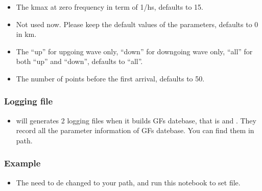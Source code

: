 \documentclass[a4paper,10pt,english,openany]{sphinxmanual}
\begin{document}
\begin{itemize}
\item {} 
The kmax at zero frequency in term of 1/hs, defaults to 15.

\end{itemize}

\begin{itemize}
\item {} 
Not used now. Please keep the default values of the parameters, defaults to 0 in km.

\end{itemize}

\begin{itemize}
\item {} 
The “up” for up\sphinxhyphen{}going wave only, “down” for down\sphinxhyphen{}going wave only, “all” for both “up” and “down”, defaults to “all”.

\end{itemize}

\begin{itemize}
\item {} 
The number of points before the first arrival, defaults to 50.

\end{itemize}


\subsubsection{Logging file}
\label{\detokenize{tutorials/S1_Build_GFs:logging-file}}\begin{itemize}
\item {} 
 will generates 2 logging files when it builds GFs datebase, that is  and
. They record all the parameter information of GFs datebase. You can find them
in  path.

\end{itemize}


\subsubsection{Example}
\label{\detokenize{tutorials/S1_Build_GFs:example}}\begin{itemize}
\item {} 
The  need to de changed to your path, and run this notebook to set  file.

\end{itemize}
\end{document}
